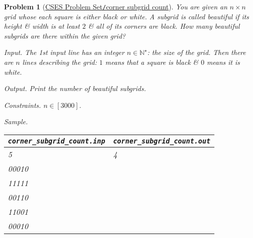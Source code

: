 \documentclass{article}
\newtheorem{problem}{Problem}
\begin{document}
\begin{problem}[\href{https://cses.fi/problemset/task/2137}{CSES Problem Set{\tt/}corner subgrid count}]
    You are given an $n\times n$ grid whose each square is either black or white. A subgrid is called {\rm beautiful} if its height \& width is at least $2$ \& all of its corners are black. How many beautiful subgrids are there within the given grid?
    \item {\sf Input.} The 1st input line has an integer $n\in\mathbb{N}^\star$: the size of the grid. Then there are $n$ lines describing the grid: $1$ means that a square is black \& $0$ means it is white.
    \item {\sf Output.} Print the number of beautiful subgrids.
    \item {\sf Constraints.} $n\in[3000]$.
    \item {\sf Sample.}
    \begin{table}[H]
        \centering
        \begin{tabular}{|l|l|}
            \hline
            \verb|corner_subgrid_count.inp| & \verb|corner_subgrid_count.out| \\
            \hline
            5 & 4 \\
            00010 & \\
            11111 & \\
            00110 & \\
            11001 & \\
            00010 & \\
            \hline
        \end{tabular}
    \end{table}
\end{problem}
\end{document}
